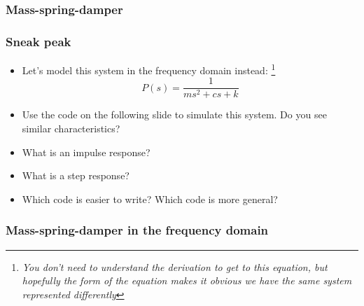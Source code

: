 \documentclass[9pt]{beamer-control}
\begin{document}
\begin{frame}
\frametitle{Mass-spring-damper}
\end{frame}

\begin{frame}
\frametitle{Sneak peak}
\begin{itemize}
\item Let's model this system in the frequency domain instead:%
\footnote{\emph{You don't need to understand the derivation to get to this equation, but hopefully the form of the equation makes it obvious we have the same system represented differently}}
\[
  P(s) = \frac{1}{ms^2+cs+k}
\]
\item Use the code on the following slide to simulate this system. Do you see similar characteristics?
\item What is an impulse response?
\item What is a step response?
\item Which code is easier to write? Which code is more general?
\end{itemize}
\end{frame}

\begin{frame}
\frametitle{Mass-spring-damper in the frequency domain}
\end{frame}
\end{document}
